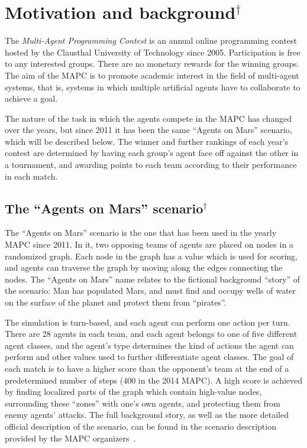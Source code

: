 \section{Motivation and background$^\dagger$}
\label{alg:zon_calculation}
The \emph{Multi-Agent Programming Contest} is an annual online programming contest hosted by the Clausthal University of Technology since 2005.
Participation is free to any interested groups.
There are no monetary rewards for the winning groups.
The aim of the MAPC is to promote academic interest in the field  of multi-agent systems, that is, systems in which multiple artificial agents have to collaborate to achieve a goal.

The nature of the task in which the agents compete in the MAPC has changed over the years, but since 2011 it has been the same \enquote{Agents on Mars} scenario, which will be described below.
The winner and further rankings of each year's contest are determined by having each group's agent face off against the other in a tournament, and awarding points to each team according to their performance in each match.

\subsection{The \enquote{Agents on Mars} scenario$^\dagger$}
The \enquote{Agents on Mars} scenario is the one that has been used in the yearly MAPC since 2011.
In it, two opposing teams of agents are placed on nodes in a randomized graph.
Each node in the graph has a value which is used for scoring, and agents can traverse the graph by moving along the edges connecting the nodes.
The \enquote{Agents on Mars} name relates to the fictional background \enquote{story} of the scenario: Man has populated Mars, and must find and occupy wells of water on the surface of the planet and protect them from \enquote{pirates}.

The simulation is turn-based, and each agent can perform one action per turn.
There are 28 agents in each team, and each agent belongs to one of five different agent classes, and the agent's type determines the kind of actions the agent can perform and other values used to further differentiate agent classes.
The goal of each match is to have a higher score than the opponent's team at the end of a predetermined number of steps (400 in the 2014 MAPC).
A high score is achieved by finding localized parts of the graph which contain high-value nodes, surrounding these \enquote{zones} with one's own agents, and protecting them from enemy agents' attacks.
The full background story, as well as the more detailed official description of the scenario, can be found in the scenario description provided by the MAPC organizers~\cite{ahlbrecht_mapc_2014}.

